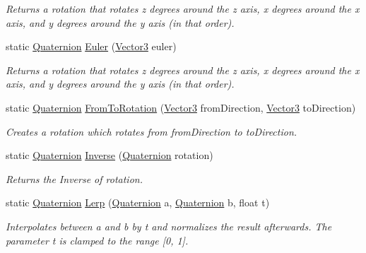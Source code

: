 \begin{DoxyCompactItemize}
\begin{DoxyCompactList}\small\item\em Returns a rotation that rotates z degrees around the z axis, x degrees around the x axis, and y degrees around the y axis (in that order). \end{DoxyCompactList}\item 
static \mbox{\hyperlink{class_lua_1_1_quaternion}{Quaternion}} \mbox{\hyperlink{class_lua_1_1_quaternion_a275393364a6f1475566b7bfe49dad51e}{Euler}} (\mbox{\hyperlink{class_lua_1_1_vector3}{Vector3}} euler)
\begin{DoxyCompactList}\small\item\em Returns a rotation that rotates z degrees around the z axis, x degrees around the x axis, and y degrees around the y axis (in that order). \end{DoxyCompactList}\item 
static \mbox{\hyperlink{class_lua_1_1_quaternion}{Quaternion}} \mbox{\hyperlink{class_lua_1_1_quaternion_a78b8152d55e05c4b35a74ed09eae9d41}{From\+To\+Rotation}} (\mbox{\hyperlink{class_lua_1_1_vector3}{Vector3}} from\+Direction, \mbox{\hyperlink{class_lua_1_1_vector3}{Vector3}} to\+Direction)
\begin{DoxyCompactList}\small\item\em Creates a rotation which rotates from from\+Direction to to\+Direction. \end{DoxyCompactList}\item 
static \mbox{\hyperlink{class_lua_1_1_quaternion}{Quaternion}} \mbox{\hyperlink{class_lua_1_1_quaternion_a324d82496815f927ebcaa21032843276}{Inverse}} (\mbox{\hyperlink{class_lua_1_1_quaternion}{Quaternion}} rotation)
\begin{DoxyCompactList}\small\item\em Returns the Inverse of rotation. \end{DoxyCompactList}\item 
static \mbox{\hyperlink{class_lua_1_1_quaternion}{Quaternion}} \mbox{\hyperlink{class_lua_1_1_quaternion_a451a68530c7d148d83024edf4bb79e26}{Lerp}} (\mbox{\hyperlink{class_lua_1_1_quaternion}{Quaternion}} a, \mbox{\hyperlink{class_lua_1_1_quaternion}{Quaternion}} b, float t)
\begin{DoxyCompactList}\small\item\em Interpolates between a and b by t and normalizes the result afterwards. The parameter t is clamped to the range \mbox{[}0, 1\mbox{]}. \end{DoxyCompactList}\item 

\end{DoxyCompactItemize}
